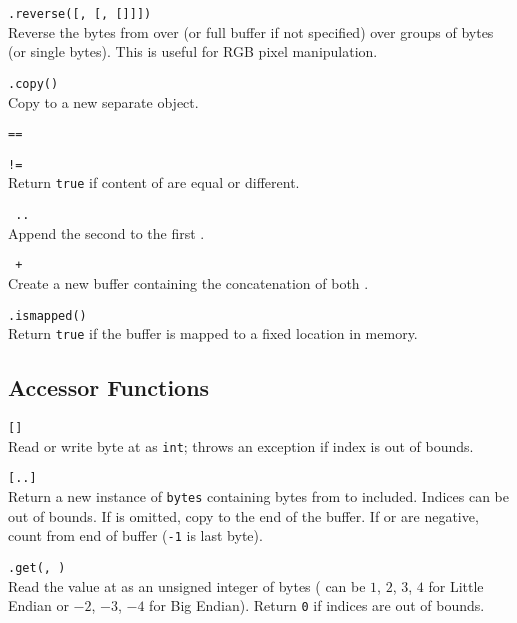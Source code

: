 \hangpar {}\texttt{.reverse([}\texttt{, [}\texttt{, [}\texttt{]]])}\\
Reverse the bytes from  over  (or full buffer if not specified) over groups of  bytes (or single bytes). This is useful for RGB pixel manipulation.

\hangpar {}\texttt{.copy()}\\
Copy to a new separate object.

\hangpar {}\texttt{==}

\hangpar {}\texttt{!=}\\
Return \texttt{true} if content of  are equal or different.

\hangpar {}\texttt{ .. }\\
Append the second  to the first .

\hangpar {}\texttt{ + }\\
Create a new  buffer containing the concatenation of both .

\hangpar {}\texttt{.ismapped()}\\
Return \texttt{true} if the buffer is mapped to a fixed location in memory.

\subsection*{Accessor Functions}

\hangpar {}\texttt{[}\texttt{]} \\
Read or write byte at  as \texttt{int}; throws an exception if index is out of bounds.

\hangpar {}\texttt{[}\texttt{..}\texttt{]} \\
Return a new instance of \texttt{bytes} containing bytes from  to  included. Indices can be out of bounds. If  is omitted, copy to the end of the buffer. If  or  are negative, count from end of buffer (\texttt{-1} is last byte).

\hangpar {}\texttt{.get(}\texttt{, }\texttt{)} \\
Read the value at  as an unsigned integer of  bytes ( can be $1$, $2$, $3$, $4$ for Little Endian or $-2$, $-3$, $-4$ for Big Endian). Return \texttt{0} if indices are out of bounds.


